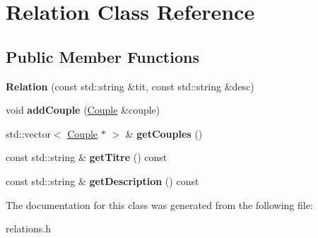 \hypertarget{class_relation}{}\section{Relation Class Reference}
\label{class_relation}
\subsection*{Public Member Functions}
\begin{DoxyCompactItemize}
\item 
\mbox{\label{class_relation_ad80d3956dac01f647bdbb740fdd1cf73}} 
{\bfseries Relation} (const std\+::string \&tit, const std\+::string \&desc)
\item 
\mbox{\label{class_relation_ad51e21a7258d6980f479dbb21f9e510c}} 
void {\bfseries add\+Couple} (\hyperlink{class_couple}{Couple} \&couple)
\item 
\mbox{\label{class_relation_a5801afed8aa44bde9fd31db7fc019e17}} 
std\+::vector$<$ \hyperlink{class_couple}{Couple} $\ast$ $>$ \& {\bfseries get\+Couples} ()
\item 
\mbox{\label{class_relation_a5cc64235be3be20a82e9ec07486b289c}} 
const std\+::string \& {\bfseries get\+Titre} () const
\item 
\mbox{\label{class_relation_a3d43bd45798051dc3aa6015aa225a7c0}} 
const std\+::string \& {\bfseries get\+Description} () const
\end{DoxyCompactItemize}


The documentation for this class was generated from the following file\+:\begin{DoxyCompactItemize}
\item 
relations.\+h\end{DoxyCompactItemize}
